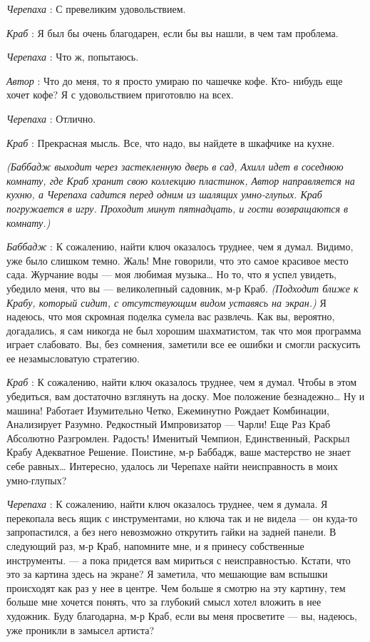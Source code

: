 \documentclass[../main.tex]{subfiles}
\begin{document}
\begin{dialogue}
\emph{Черепаха} : С превеликим удовольствием.

\emph{Краб} : Я был бы очень благодарен, если бы вы нашли, в чем там проблема.

\emph{Черепаха} : Что ж, попытаюсь.

\emph{Автор} : Что до меня, то я просто умираю по чашечке кофе. Кто- нибудь еще хочет кофе? Я с удовольствием приготовлю на всех.

\emph{Черепаха} : Отлично.

\emph{Краб} : Прекрасная мысль. Все, что надо, вы найдете в шкафчике на кухне.

\emph{(Баббадж выходит через застекленную дверь в сад, Ахилл идет в соседнюю комнату, где Краб хранит свою коллекцию пластинок, Автор направляется на кухню, а Черепаха садится перед одним из шалящих умно-глупых. Краб погружается в игру. Проходит минут пятнадцать, и гости возвращаются в комнату.)}

\emph{Баббадж} : К сожалению, найти ключ оказалось труднее, чем я думал. Видимо, уже было слишком темно. Жаль! Мне говорили, что это самое красивое место сада. Журчание воды --- моя любимая музыка\ldots{} Но то, что я успел увидеть, убедило меня, что вы --- великолепный садовник, м-р Краб. \emph{(Подходит ближе к Крабу, который сидит, с отсутствующим видом уставясь на экран.)} Я надеюсь, что моя скромная поделка сумела вас развлечь. Как вы, вероятно, догадались, я сам никогда не был хорошим шахматистом, так что моя программа играет слабовато. Вы, без сомнения, заметили все ее ошибки и смогли раскусить ее незамысловатую стратегию.

\emph{Краб} : К сожалению, найти ключ оказалось труднее, чем я думал. Чтобы в этом убедиться, вам достаточно взглянуть на доску. Мое положение безнадежно\ldots{} Ну и машина! Работает Изумительно Четко, Ежеминутно Рождает Комбинации, Анализирует Разумно. Редкостный Импровизатор --- Чарли! Еще Раз Краб Абсолютно Разгромлен. Радость! Именитый Чемпион, Единственный, Раскрыл Крабу Адекватное Решение. Поистине, м-р Баббадж, ваше мастерство не знает себе равных\ldots{} Интересно, удалось ли Черепахе найти неисправность в моих умно-глупых?

\emph{Черепаха} : К сожалению, найти ключ оказалось труднее, чем я думала. Я перекопала весь ящик с инструментами, но ключа так и не видела --- он куда-то запропастился, а без него невозможно открутить гайки на задней панели. В следующий раз, м-р Краб, напомните мне, и я принесу собственные инструменты. --- а пока придется вам мириться с неисправностью. Кстати, что это за картина здесь на экране? Я заметила, что мешающие вам вспышки происходят как раз у нее в центре. Чем больше я смотрю на эту картину, тем больше мне хочется понять, что за глубокий смысл хотел вложить в нее художник. Буду благодарна, м-р Краб, если вы меня просветите --- вы, надеюсь, уже проникли в замысел артиста?


\end{dialogue}
\end{document}
